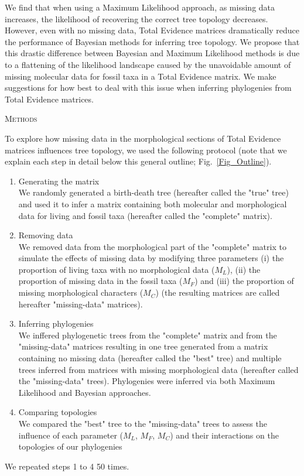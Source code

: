 \documentclass[12pt,letterpaper]{article}
\renewcommand{\section}[1]{%
\bigskip
\begin{center}
\begin{Large}
\normalfont\scshape #1
\medskip
\end{Large}
\end{center}}
\begin{document}
We find that when using a Maximum Likelihood approach, as missing data increases, the likelihood of recovering the correct tree topology decreases. However, even with no missing data, Total Evidence matrices dramatically reduce the performance of Bayesian methods for inferring tree topology. We propose that this drastic difference between Bayesian and Maximum Likelihood methods is due to a flattening of the likelihood landscape caused by the unavoidable amount of missing molecular data for fossil taxa in a Total Evidence matrix. We make suggestions for how best to deal with this issue when inferring phylogenies from Total Evidence matrices.


%
%

 
\newpage

\section{Methods}
To explore how missing data in the morphological sections of Total Evidence matrices influences tree topology, we used the following protocol (note that we explain each step in detail below this general outline; Fig.~\ref{Fig_Outline}).
\begin{enumerate}
\item{Generating the matrix} \label{step:generate_matrix} \\
We randomly generated a birth-death tree (hereafter called the "true" tree) and used it to infer a matrix containing both molecular and morphological data for living and fossil taxa (hereafter called the "complete" matrix).
\item{Removing data} \label{step:remove_data} \\
We removed data from the morphological part of the "complete" matrix to simulate the effects of missing data by modifying three parameters (i) the proportion of living taxa with no morphological data ($M_{L}$), (ii) the proportion of missing data in the fossil taxa ($M_{F}$) and (iii) the proportion of missing morphological characters ($M_{C}$) (the resulting matrices are called hereafter "missing-data" matrices).
\item{Inferring phylogenies} \label{step:build_phylo} \\
We inffered phylogenetic trees from the "complete" matrix and from the "missing-data" matrices resulting in one tree generated from a matrix containing no missing data (hereafter called the "best" tree) and multiple trees inferred from matrices with missing morphological data (hereafter called the "missing-data" trees). Phylogenies were inferred via both Maximum Likelihood and Bayesian approaches.
\item{Comparing topologies} \label{step:compare_topo} \\
We compared the "best" tree to the "missing-data" trees to assess the influence of each parameter ($M_{L}$, $M_{F}$, $M_{C}$) and their interactions on the topologies of our phylogenies
\end{enumerate}
We repeated steps 1 to 4 50 times.
\end{document}
